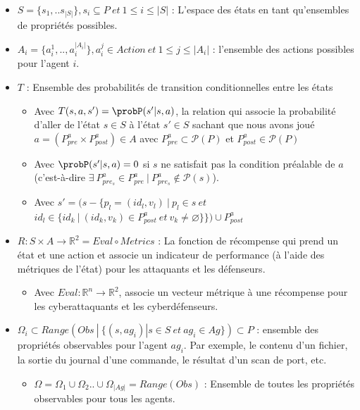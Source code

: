 \begin{itemize}
    \item $S = \{s_1, ..s_{|S|}\}, s_{i} \subseteq P \: et \: 1 \le i \le |S|$ : L'espace des états en tant qu'ensembles de propriétés possibles.

    \item $A_{i} = \{a_{i}^{1},..,a_{i}^{|A_{i}|}\}, a_{i}^j \in Action \: et \: 1 \le j \le |A_i|$ : l'ensemble des actions possibles pour l'agent $i$.

    \item $T$ : Ensemble des probabilités de transition conditionnelles entre les états
          \begin{itemize}
              \item Avec $T(s,a,s') = \probP(s'|s,a)$, la relation qui associe la probabilité d'aller de l'état $s \in S$ à l'état $s' \in S$ sachant que nous avons joué $a = (P^a_{pre} \times P^a_{post}) \in A$ avec $P^a_{pre} \subset \mathcal{P}(P)$ et $P^a_{post} \in \mathcal{P}(P)$
              \item Avec $\probP(s'|s,a) = 0$ si $s$ ne satisfait pas la condition préalable de $a$ (c'est-à-dire $\exists \: P_{pre_s}^{a} \in P_{pre}^{a} \: | \: P_{pre_s}^{a} \not\in \mathcal{P}(s)$).
              \item Avec $s' = (s - \{p_l=(id_l, v_l) \: | \: p_l \in s \: et$ $id_l \in \{id_k \: | \: (id_k, v_k) \in P^a_{post} \: et \: v_k \neq \varnothing\}\}) \cup P^a_{post}$
          \end{itemize}



    \item $R : S \times A \rightarrow \mathbb{R}^2 = Eval \circ Metrics$ : La fonction de récompense qui prend un état et une action et associe un indicateur de performance (à l'aide des métriques de l'état) pour les attaquants et les défenseurs.
          \begin{itemize}
              \item Avec $Eval : \mathbb{R}^{n} \rightarrow \mathbb{R}^2$, associe un vecteur métrique à une récompense pour les cyberattaquants et les cyberdéfenseurs.
          \end{itemize}



    \item $\Omega_{i} \subset Range(Obs \: | \: \{ (s, ag_i) | s \in S \: et \: ag_i \in Ag \}) \subset P$ : ensemble des propriétés observables pour l'agent $ag_i$. Par exemple, le contenu d'un fichier, la sortie du journal d'une commande, le résultat d'un scan de port, etc.
          \begin{itemize}
              \item $\Omega = \Omega_1 \cup \Omega_2 .. \cup \Omega_{|Ag|} = Range(Obs)$ : Ensemble de toutes les propriétés observables pour tous les agents.
          \end{itemize}


\end{itemize}
